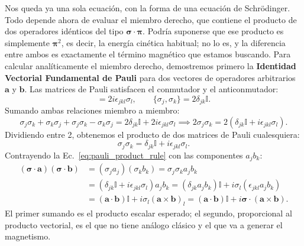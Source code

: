 \documentclass[10pt,a4paper]{article}
\begin{document}
Nos queda ya una sola ecuación, con la forma de una ecuación de Schrödinger. Todo depende ahora de evaluar el miembro derecho, que contiene el producto de dos operadores idénticos del tipo $\boldsymbol{\sigma}\cdot\boldsymbol{\pi}$. Podría suponerse que ese producto es simplemente $\boldsymbol{\pi}^2$, es decir, la energía cinética habitual; no lo es, y la diferencia entre ambos es exactamente el término magnético que estamos buscando. Para calcular analíticamente el miembro derecho, demostremos primero la \textbf{Identidad Vectorial Fundamental de Pauli} para dos vectores de operadores arbitrarios $\mathbf{a}$ y $\mathbf{b}$. Las matrices de Pauli satisfacen el conmutador y el anticonmutador:
\begin{equation}
[\sigma_j, \sigma_k] = 2i \epsilon_{jkl} \sigma_l, \qquad \{\sigma_j, \sigma_k\} = 2\delta_{jk} \mathbb{I}.
\end{equation}
Sumando ambas relaciones miembro a miembro:
\begin{equation}
\sigma_j \sigma_k + \sigma_k \sigma_j + \sigma_j \sigma_k - \sigma_k \sigma_j = 2\delta_{jk}\mathbb{I} + 2i\epsilon_{jkl}\sigma_l \implies 2\sigma_j \sigma_k = 2(\delta_{jk}\mathbb{I} + i\epsilon_{jkl}\sigma_l).
\end{equation}
Dividiendo entre 2, obtenemos el producto de dos matrices de Pauli cualesquiera:
\begin{equation}
\sigma_j \sigma_k = \delta_{jk}\mathbb{I} + i\epsilon_{jkl}\sigma_l.
\label{eq:pauli_product_rule}
\end{equation}
Contrayendo la Ec.~\eqref{eq:pauli_product_rule} con las componentes $a_j b_k$:
\begin{align}
(\boldsymbol{\sigma} \cdot \mathbf{a})(\boldsymbol{\sigma} \cdot \mathbf{b}) &= (\sigma_j a_j)(\sigma_k b_k) = \sigma_j \sigma_k a_j b_k \nonumber \\
&= (\delta_{jk}\mathbb{I} + i\epsilon_{jkl}\sigma_l) a_j b_k = (\delta_{jk} a_j b_k)\mathbb{I} + i \sigma_l (\epsilon_{jkl} a_j b_k) \nonumber \\
&= (\mathbf{a} \cdot \mathbf{b})\mathbb{I} + i \sigma_l (\mathbf{a} \times \mathbf{b})_l = (\mathbf{a} \cdot \mathbf{b})\mathbb{I} + i \boldsymbol{\sigma} \cdot (\mathbf{a} \times \mathbf{b}).
\label{eq:pauli_vector_identity}
\end{align}
El primer sumando es el producto escalar esperado; el segundo, proporcional al producto vectorial, es el que no tiene análogo clásico y el que va a generar el magnetismo.
\end{document}
